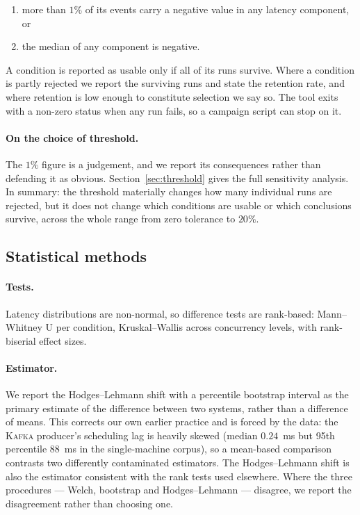 \documentclass[Afour,sageh,times]{sagej}
\newcommand{\kafka}{\textsc{Kafka}}
\begin{document}
\begin{enumerate}
\item more than $1\%$ of its events carry a negative value in any latency component, or
\item the median of any component is negative.
\end{enumerate}

A condition is reported as usable only if all of its runs survive. Where a condition is partly
rejected we report the surviving runs and state the retention rate, and where retention is low
enough to constitute selection we say so. The tool exits with a non-zero status when any run
fails, so a campaign script can stop on it.

\paragraph{On the choice of threshold.} The $1\%$ figure is a judgement, and we report its
consequences rather than defending it as obvious. Section~\ref{sec:threshold} gives the full
sensitivity analysis. In summary: the threshold materially changes how many individual runs are
rejected, but it does not change which conditions are usable or which conclusions survive, across
the whole range from zero tolerance to $20\%$.

\subsection{Statistical methods}
\label{sec:stat_methods}

\paragraph{Tests.} Latency distributions are non-normal, so difference tests are rank-based:
Mann--Whitney U \cite{mann1947test} per condition, Kruskal--Wallis \cite{kruskal1952use} across
concurrency levels, with rank-biserial effect sizes.

\paragraph{Estimator.} We report the Hodges--Lehmann shift \cite{hodges1963estimates} with a
percentile bootstrap interval \cite{efron1979bootstrap} as the primary estimate of the difference
between two systems, rather than a difference of means. This corrects our own earlier practice
and is forced by the data: the \kafka{} producer's scheduling lag is heavily skewed (median
$0.24$~ms but 95th percentile $88$~ms in the single-machine corpus), so a mean-based comparison
contrasts two differently contaminated estimators. The Hodges--Lehmann shift is also the estimator
consistent with the rank tests used elsewhere. Where the three procedures --- Welch, bootstrap and
Hodges--Lehmann --- disagree, we report the disagreement rather than choosing one.
\end{document}

